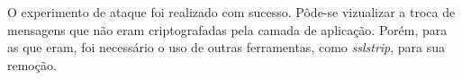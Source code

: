 \documentclass[12pt]{article}
\begin{document}
O experimento de ataque foi realizado com sucesso. Pôde-se vizualizar a troca de mensagens que não eram criptografadas pela camada de aplicação. Porém, para as que eram, foi necessário o uso de outras ferramentas, como \textit{sslstrip}, para sua remoção.







     
\end{document}
